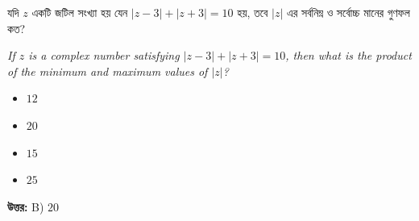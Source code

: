 \documentclass[12pt, a4paper]{article}
\begin{document}
\begin{tcolorbox}[questionbox={প্রশ্ন (Question) 16}]
    \noindent
    যদি $z$ একটি জটিল সংখ্যা হয় যেন $|z - 3| + |z + 3| = 10$ হয়, তবে $|z|$ এর সর্বনিম্ন ও সর্বোচ্চ মানের গুণফল কত?
    
    \vspace{0.8em}
    \begin{english}
    \noindent\textit{\color{darkgray}
    If $z$ is a complex number satisfying $|z - 3| + |z + 3| = 10$, then what is the product of the minimum and maximum values of $|z|$?
    }
    \end{english}
\end{tcolorbox}

\begin{itemize}[label={}, leftmargin=1cm, itemsep=0.5em]
    \item[\textbf{A)}] $12$
    \item[\textbf{B)}] $20$
    \item[\textbf{C)}] $15$
    \item[\textbf{D)}] $25$
\end{itemize}

\vspace{0.5em}
\begin{tcolorbox}[answerbox]
    \textbf{\color{success} উত্তর:} B) $20$
\end{tcolorbox}
\vspace{1em}
\end{document}

